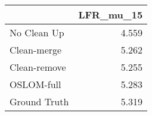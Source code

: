 \begin{tabular}{lr}
\toprule
{} & LFR_mu_15 \\
\midrule
No Clean Up  &     4.559 \\
Clean-merge  &     5.262 \\
Clean-remove &     5.255 \\
OSLOM-full   &     5.283 \\
Ground Truth &     5.319 \\
\bottomrule
\end{tabular}
